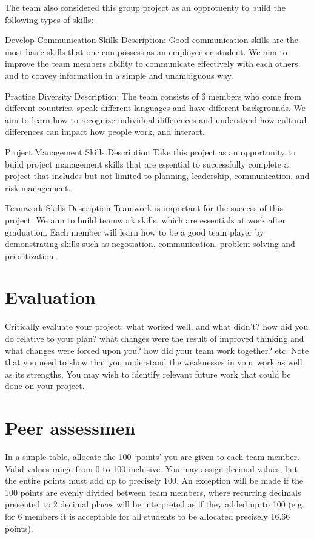 \documentclass{article}
\begin{document}
The team also considered this group project as an opprotuenty to build the following types of skills:

Develop Communication Skills
Description: Good communication skills are the most basic skills that one can possess as an employee or student. We aim to improve the team members ability to communicate effectively with each others and to convey information in a simple and unambiguous way.

Practice Diversity
Description: The team consists of 6 members who come from different countries, speak different languages and have different backgrounds. We aim to learn how to recognize individual differences and understand how cultural differences can impact how people work, and interact.

Project Management Skills
Description
Take this project as an opportunity to build project management skills that are essential to successfully complete a project that includes but not limited to planning, leadership, communication, and risk management.

Teamwork Skills
Description
Teamwork is important for the success of this project. We aim to build teamwork skills, which are essentials at work after graduation. Each member will learn how to be a good team player by demonstrating skills such as negotiation, communication, problem solving and prioritization.


\section{Evaluation}
Critically evaluate your project: what worked well, and what didn’t? how did you do relative to your plan? what changes were the result of improved thinking and what changes were forced upon you? how did your team work together? etc. Note that you need to show that you understand the weaknesses in your work as well as its strengths. You may wish to identify relevant future work that could be done on your project.

\section{Peer assessmen}
In a simple table, allocate the 100 ‘points’ you are given to each team member. Valid values range from 0 to 100 inclusive. You may assign decimal values, but the entire points must add up to precisely 100. An exception will be made if the 100 points are evenly divided between team members, where recurring decimals presented to 2 decimal places will be interpreted as if they added up to 100 (e.g. for 6 members it is acceptable for all students to be allocated precisely 16.66 points).
\end{document}
